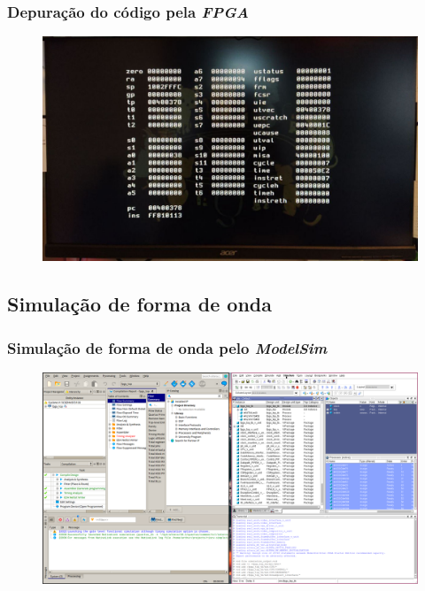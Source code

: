 \documentclass[aspectratio=169]{beamer}
\begin{document}
    \begin{frame}
        \frametitle{Depuração do código pela \textit{FPGA}}
        \vfill
        \begin{figure}[H]
        \centering
            \includegraphics[width=.9\textwidth,height=.85\textheight,keepaspectratio]
            {../images/osd/display_osd.jpg}
        \end{figure}
        \vfill
    \end{frame}

    \subsection{Simulação de forma de onda}
    \begin{frame}
        \frametitle{Simulação de forma de onda pelo \textit{ModelSim}}
        \vfill
        \begin{figure}[H]
        \centering
            \includegraphics[width=.9\textwidth,height=.85\textheight,keepaspectratio]
            {../images/quartus/quartus_modelsim.png}
        \end{figure}
        \vfill
    \end{frame}
\end{document}
